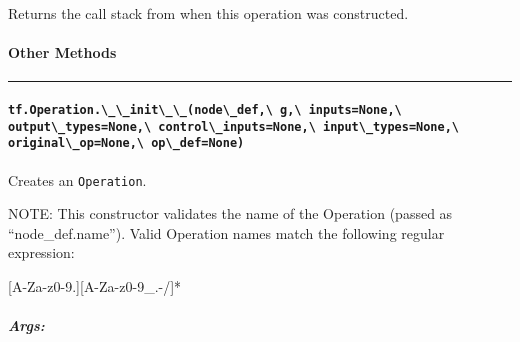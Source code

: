 Returns the call stack from when this operation was constructed.

\paragraph{Other Methods }\label{other-methods}

\begin{center}\rule{0.5\linewidth}{\linethickness}\end{center}

\paragraph{\texorpdfstring{\lstinline{tf.Operation.\_\_init\_\_(node\_def,\ g,\ inputs=None,\ output\_types=None,\ control\_inputs=None,\ input\_types=None,\ original\_op=None,\ op\_def=None)}
}{tf.Operation.\_\_init\_\_(node\_def, g, inputs=None, output\_types=None, control\_inputs=None, input\_types=None, original\_op=None, op\_def=None) }}\label{tf.operation.ux5fux5finitux5fux5fnodeux5fdef-g-inputsnone-outputux5ftypesnone-controlux5finputsnone-inputux5ftypesnone-originalux5fopnone-opux5fdefnone}

Creates an \lstinline{Operation}.

NOTE: This constructor validates the name of the Operation (passed as
``node\_def.name''). Valid Operation names match the following regular
expression:

{[}A-Za-z0-9.{]}{[}A-Za-z0-9\_.-/{]}*

\subparagraph{Args: }\label{args-14}

